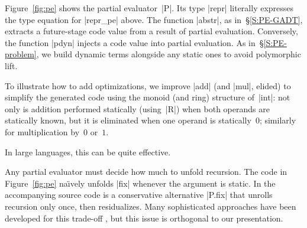 Figure~\ref{fig:pe} shows the partial evaluator~|P|.
Its type |repr| literally expresses the type equation for |repr_pe| above.
The function |abstr|, as in~\S\ref{S:PE-GADT},
extracts a future-stage code value from a result of
partial evaluation.  Conversely, the function |pdyn| injects a
code value into partial evaluation. As
in~\S\ref{S:PE-problem}, we build dynamic terms alongside
any static ones to avoid polymorphic lift.

To illustrate how to add optimizations, we improve |add| (and |mul|,
elided) to simplify the generated code using the monoid (and ring)
structure of~|int|: not only is addition performed statically
(using~|R|) when both operands are statically known, but it is
eliminated when one operand is statically~$0$; similarly for
multiplication by~$0$ or~$1$.  
\begin{comment}
Such algebraic simplifications are easy
to abstract over the specific domain (such as monoid or ring) where they
apply.  These simplifications and abstractions help a lot in a large
language with more base types and primitive operations.
\end{comment}
In large languages, this can be quite effective.

Any partial evaluator must decide how much to unfold recursion. The code in
Figure~\ref{fig:pe} na\"\i vely unfolds |fix| whenever the
argument is static.  In the accompanying source code is a conservative
alternative |P.fix| that unrolls recursion only once, then residualizes.
Many sophisticated approaches have been developed for this trade-off
\cite{jones-partial}, but this issue is orthogonal to our presentation.
\begin{comment}
Any partial evaluator must decide how much to unfold recursion
statically: unfolding too little can degrade the residual code, whereas
unfolding too much risks nontermination.  Our partial evaluator is no
exception, because our object language includes |fix|.  The code in
Figure~\ref{fig:pe} takes the na\"\i ve approach of ``going all the
way'', that is, unfold |fix| rather than residualize whenever the
argument is static.  In the accompanying source code is a conservative
alternative |P.fix| that unrolls recursion only once, then residualizes.
Many sophisticated approaches have been developed to make this trade-off
\cite{jones-partial}, but this issue is orthogonal to our presentation.
A separate concern in our treatment of |fix| is possible code bloat in
the residual program, which calls for let-insertion
\cite{SwadiTahaKiselyovPasalic2006}.
\end{comment}


